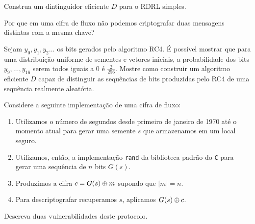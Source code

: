 \begin{exercicio}
  Construa um dintinguidor eficiente $D$ para o RDRL simples.
\end{exercicio}

\begin{exercicio}
  Por que em uma cifra de fluxo não podemos criptografar duas mensagens distintas com a mesma chave?
\end{exercicio}

\begin{exercicio}
 Sejam $y_0, y_1, y_2 \dots$ os bits gerados pelo algoritmo RC4.
É possível mostrar que para uma distribuição uniforme de sementes e vetores iniciais, a probabilidade dos bits $y_9, \dots, y_{16}$ serem todos iguais a $0$ é $\frac{2}{256}$.
Mostre como construir um algoritmo eficiente $D$ capaz de distinguir as sequências de bits produzidas pelo RC4 de uma sequência realmente aleatória.
\end{exercicio}

\begin{exercicio}
  Considere a seguinte implementação de uma cifra de fluxo:
\begin{enumerate}
\item Utilizamos o número de segundos desde primeiro de janeiro de 1970 até o momento atual para gerar uma semente $s$ que armazenamos em um local seguro.
\item Utilizamos, então, a implementação {\tt rand} da biblioteca padrão do {\tt C} para gerar uma sequência de $n$ bits $G(s)$.
\item Produzimos a cifra $c = G(s) \oplus m$ supondo que $|m| = n$.
\item Para descriptografar recuperamos $s$, aplicamos $G(s) \oplus c$.
\end{enumerate}

  Descreva duas vulnerabilidades deste protocolo.
\end{exercicio}


